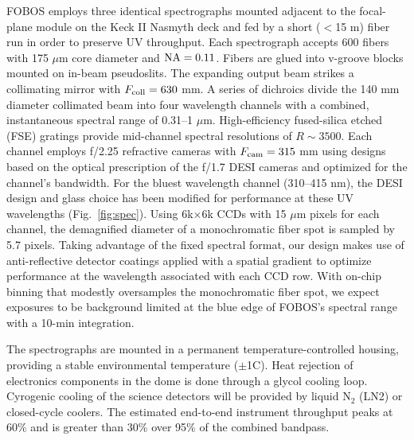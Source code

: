 \documentclass[oneside,11pt]{amsart}
\begin{document}
FOBOS employs three identical spectrographs mounted adjacent to the focal-plane module on the Keck II Nasmyth deck and fed by a short ($<$15 m) fiber run in order to preserve UV throughput.  Each spectrograph accepts 600 fibers with 175 $\mu$m core diameter and ${\rm NA} = 0.11$.  Fibers are glued into v-groove blocks mounted on in-beam pseudoslits.  The expanding output beam strikes a collimating mirror with $F_{\rm coll} = 630$ mm. A series of dichroics divide the 140 mm diameter collimated beam into four wavelength channels with a combined, instantaneous spectral range of 0.31--1 $\mu$m. High-efficiency fused-silica etched (FSE) gratings \citep{ZeitnerFSE} provide mid-channel spectral resolutions of $R \sim 3500$.  Each channel employs f/2.25 refractive cameras with $F_{\rm cam} = 315$ mm using designs based on the optical prescription of the f/1.7 DESI cameras and optimized for the channel’s bandwidth.  For the bluest wavelength channel (310--415 nm), the DESI design and glass choice has been modified for performance at these UV wavelengths (Fig.~\ref{fig:spec}).  Using 6k$\times$6k CCDs with 15 $\mu$m pixels for each channel, the demagnified diameter of a monochromatic fiber spot is sampled by 5.7 pixels. Taking advantage of the fixed spectral format, our design makes use of anti-reflective detector coatings applied with a spatial gradient to optimize performance at the wavelength associated with each CCD row. With on-chip binning that modestly oversamples the monochromatic fiber spot, we expect exposures to be background limited at the blue edge of FOBOS's spectral range with a 10-min integration.


The spectrographs are mounted in a permanent temperature-controlled housing, providing a stable environmental temperature ($\pm$1C). Heat rejection of electronics components in the dome is done through a glycol cooling loop. Cyrogenic cooling of the science detectors will be provided by liquid N$_2$ (LN2) or closed-cycle coolers. The estimated end-to-end instrument throughput peaks at 60\% and is greater than 30\% over 95\% of the combined bandpass.

\end{document}
